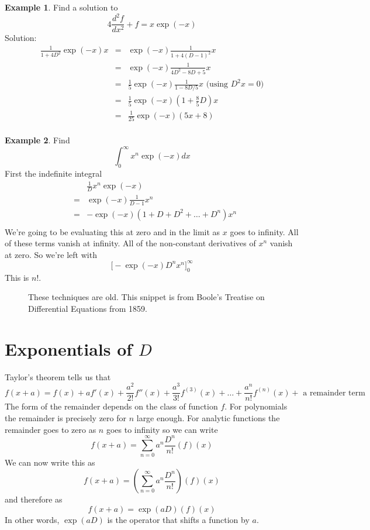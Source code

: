 \documentclass[a4paper]{article}
\theoremstyle{definition}
\newtheorem{example}{Example}[section]
\begin{document}
\begin{example}
Find a solution to
\[
4\frac{d^2f}{dx^2}+f = x\exp(-x)
\]
Solution:
\begin{eqnarray*}
\frac{1}{1+4D^2}\exp(-x)x & = & \exp(-x)\frac{1}{1+4(D-1)^2}x \\
& = & \exp(-x)\frac{1}{4D^2-8D+5}x \\
& = & \frac{1}{5}\exp(-x)\frac{1}{1-8D/5}x \mbox{ (using $D^2x=0$)}\\
& = & \frac{1}{5}\exp(-x)(1+\frac{8}{5}D)x \\
& = & \frac{1}{25}\exp(-x)(5x+8) \\
\end{eqnarray*}

\end{example}

\begin{example}
Find
\[
\int_0^\infty x^n\exp(-x)dx
\]
First the indefinite integral
\begin{eqnarray*}
&   & \frac{1}{D}x^n\exp(-x) \\
& = & \exp(-x)\frac{1}{D-1}x^n \\
& = & -\exp(-x)(1+D+D^2+\ldots+D^n)x^n \\
\end{eqnarray*}
We're going to be evaluating this at zero and in the limit as $x$ goes to infinity.
All of these terms vanish at infinity.
All of the non-constant derivatives of $x^n$ vanish at zero.
So we're left with
\[
\Big[-\exp(-x)D^nx^n\Big]_0^\infty
\]
This is $n!$.
\end{example}

\begin{figure}
\centering
{}
\caption{These techniques are old. This snippet is from Boole's Treatise on Differential Equations from 1859.}
\end{figure}

\section{Exponentials of $D$}
Taylor's theorem tells us that
\[
f(x+a) = f(x)+af'(x)+\frac{a^2}{2!}f''(x)+\frac{a^3}{3!}f^{(3)}(x)+\ldots+\frac{a^n}{n!}f^{(n)}(x)+\mbox{ a remainder term}
\]
The form of the remainder depends on the class of function $f$.
For polynomials the remainder is precisely zero for $n$ large enough.
For analytic functions the remainder goes to zero as $n$ goes to infinity so we can write
\[
f(x+a) = \sum_{n=0}^\infty a^n\frac{D^n}{n!}(f)(x)
\]
We can now write this as
\[
f(x+a) = (\sum_{n=0}^\infty a^n\frac{D^n}{n!})(f)(x)
\]
and therefore as
\[
f(x+a) = \exp(aD)(f)(x)
\]
In other words, $\exp(aD)$ is the operator that shifts a function by $a$.
\end{document}
